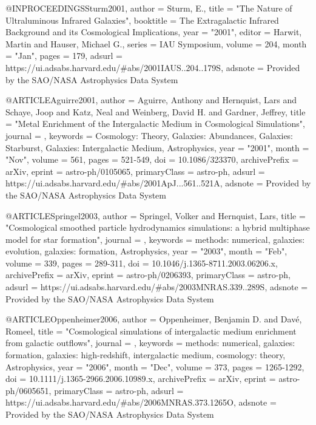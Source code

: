 {@INPROCEEDINGS{Sturm2001,
       author = {{Sturm}, E.},
        title = "{The Nature of Ultraluminous Infrared Galaxies}",
    booktitle = {The Extragalactic Infrared Background and its Cosmological Implications},
         year = "2001",
       editor = {{Harwit}, Martin and {Hauser}, Michael G.},
       series = {IAU Symposium},
       volume = {204},
        month = "Jan",
        pages = {179},
       adsurl = {https://ui.adsabs.harvard.edu/\#abs/2001IAUS..204..179S},
      adsnote = {Provided by the SAO/NASA Astrophysics Data System}
}

@ARTICLE{Aguirre2001,
       author = {{Aguirre}, Anthony and {Hernquist}, Lars and {Schaye}, Joop and
         {Katz}, Neal and {Weinberg}, David H. and {Gardner}, Jeffrey},
        title = "{Metal Enrichment of the Intergalactic Medium in Cosmological Simulations}",
      journal = {\apj},
     keywords = {Cosmology: Theory, Galaxies: Abundances, Galaxies: Starburst, Galaxies: Intergalactic Medium, Astrophysics},
         year = "2001",
        month = "Nov",
       volume = {561},
        pages = {521-549},
          doi = {10.1086/323370},
archivePrefix = {arXiv},
       eprint = {astro-ph/0105065},
 primaryClass = {astro-ph},
       adsurl = {https://ui.adsabs.harvard.edu/\#abs/2001ApJ...561..521A},
      adsnote = {Provided by the SAO/NASA Astrophysics Data System}
}

@ARTICLE{Springel2003,
       author = {{Springel}, Volker and {Hernquist}, Lars},
        title = "{Cosmological smoothed particle hydrodynamics simulations: a hybrid multiphase model for star formation}",
      journal = {\mnras},
     keywords = {methods: numerical, galaxies: evolution, galaxies: formation, Astrophysics},
         year = "2003",
        month = "Feb",
       volume = {339},
        pages = {289-311},
          doi = {10.1046/j.1365-8711.2003.06206.x},
archivePrefix = {arXiv},
       eprint = {astro-ph/0206393},
 primaryClass = {astro-ph},
       adsurl = {https://ui.adsabs.harvard.edu/\#abs/2003MNRAS.339..289S},
      adsnote = {Provided by the SAO/NASA Astrophysics Data System}
}

@ARTICLE{Oppenheimer2006,
       author = {{Oppenheimer}, Benjamin D. and {Dav{\'e}}, Romeel},
        title = "{Cosmological simulations of intergalactic medium enrichment from galactic outflows}",
      journal = {\mnras},
     keywords = {methods: numerical, galaxies: formation, galaxies: high-redshift, intergalactic medium, cosmology: theory, Astrophysics},
         year = "2006",
        month = "Dec",
       volume = {373},
        pages = {1265-1292},
          doi = {10.1111/j.1365-2966.2006.10989.x},
archivePrefix = {arXiv},
       eprint = {astro-ph/0605651},
 primaryClass = {astro-ph},
       adsurl = {https://ui.adsabs.harvard.edu/\#abs/2006MNRAS.373.1265O},
      adsnote = {Provided by the SAO/NASA Astrophysics Data System}
}

}
